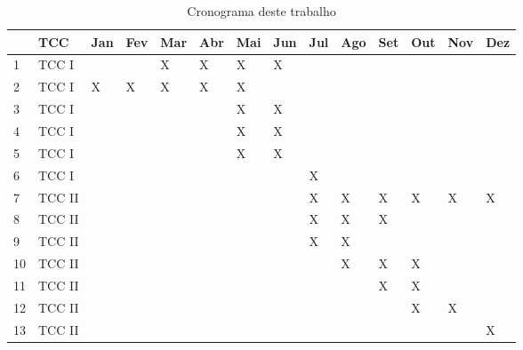 \begin{table}[h!]\normalsize %
\caption {Cronograma deste trabalho}
\label{tab:implcronograma}
\begin{center}
\def\arraystretch{1}
\setlength{\tabcolsep}{0.15cm}
\begin{tabular}{|l|l|l|l|l|l|l|l|l|l|l|l|l|l|}\hline
 & \textbf{TCC} & \textbf{Jan} & \textbf{Fev} & \textbf{Mar} & \textbf{Abr} & \textbf{Mai} & \textbf{Jun} & \textbf{Jul} & \textbf{Ago} & \textbf{Set} & \textbf{Out} & \textbf{Nov} & \textbf{Dez} \\\hline
1 & TCC I & & & X & X & X & X & & & & & & \\\hline
2 & TCC I & X & X & X & X & X & & & & & & & \\\hline
3 & TCC I & & & & & X & X & & & & & & \\\hline
4 & TCC I & & & & & X & X & & & & & & \\\hline
5 & TCC I & & & & & X & X & & & & & & \\\hline
6 & TCC I & & & & & & & X & & & & & \\\hline
7 & TCC II & & & & & & & X & X & X & X & X & X \\\hline
8 & TCC II & & & & & & & X & X & X & & & \\\hline
9 & TCC II & & & & & & & X & X & & & & \\\hline
10 & TCC II & & & & & & & & X & X & X & & \\\hline
11 & TCC II & & & & & & & & & X & X & & \\\hline
12 & TCC II & & & & & & & & & & X & X & \\\hline
13 & TCC II & & & & & & & & & & & & X \\\hline
\end{tabular}
\end{center}
\end{table}
